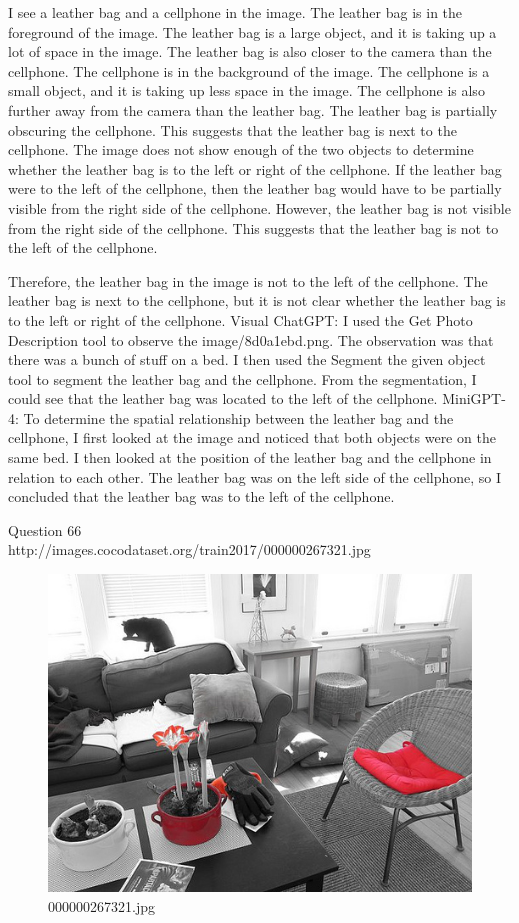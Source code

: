 \begin{enumerate}
    I see a leather bag and a cellphone in the image.
    The leather bag is in the foreground of the image. The leather bag is a large object, and it is taking up a lot of space in the image. The leather bag is also closer to the camera than the cellphone.
    The cellphone is in the background of the image. The cellphone is a small object, and it is taking up less space in the image. The cellphone is also further away from the camera than the leather bag.
    The leather bag is partially obscuring the cellphone. This suggests that the leather bag is next to the cellphone.
    The image does not show enough of the two objects to determine whether the leather bag is to the left or right of the cellphone.
    If the leather bag were to the left of the cellphone, then the leather bag would have to be partially visible from the right side of the cellphone. However, the leather bag is not visible from the right side of the cellphone. This suggests that the leather bag is not to the left of the cellphone.
    
    Therefore, the leather bag in the image is not to the left of the cellphone. The leather bag is next to the cellphone, but it is not clear whether the leather bag is to the left or right of the cellphone.   
    \subitem Visual ChatGPT: I used the Get Photo Description tool to observe the image/8d0a1ebd.png. The observation was that there was a bunch of stuff on a bed. I then used the Segment the given object tool to segment the leather bag and the cellphone. From the segmentation, I could see that the leather bag was located to the left of the cellphone.
    \subitem MiniGPT-4: To determine the spatial relationship between the leather bag and the cellphone, I first looked at the image and noticed that both objects were on the same bed. I then looked at the position of the leather bag and the cellphone in relation to each other. The leather bag was on the left side of the cellphone, so I concluded that the leather bag was to the left of the cellphone. 
\end{enumerate}
Question 66\\
http://images.cocodataset.org/train2017/000000267321.jpg
\begin{figure}[h]
    \centering
    \includegraphics[width=0.8\linewidth]{../image set/hard/000000267321.jpg}
    \caption{000000267321.jpg}
\end{figure}
